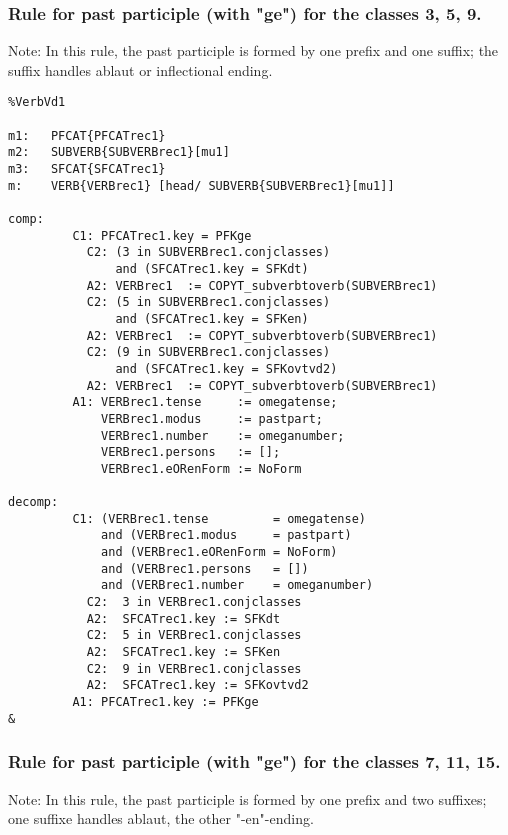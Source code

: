 \subsubsection{Rule for past participle (with "ge") for the classes  3, 5, 9.}

Note: In this rule, the past participle is formed by one prefix and one
suffix; the suffix handles ablaut or inflectional ending.

\begin{verbatim}
%VerbVd1 

m1:   PFCAT{PFCATrec1}
m2:   SUBVERB{SUBVERBrec1}[mu1]
m3:   SFCAT{SFCATrec1}
m:    VERB{VERBrec1} [head/ SUBVERB{SUBVERBrec1}[mu1]]

comp:
         C1: PFCATrec1.key = PFKge 
           C2: (3 in SUBVERBrec1.conjclasses) 
               and (SFCATrec1.key = SFKdt) 
           A2: VERBrec1  := COPYT_subverbtoverb(SUBVERBrec1)
           C2: (5 in SUBVERBrec1.conjclasses)
               and (SFCATrec1.key = SFKen) 
           A2: VERBrec1  := COPYT_subverbtoverb(SUBVERBrec1)
           C2: (9 in SUBVERBrec1.conjclasses)
               and (SFCATrec1.key = SFKovtvd2) 
           A2: VERBrec1  := COPYT_subverbtoverb(SUBVERBrec1)
         A1: VERBrec1.tense     := omegatense;
             VERBrec1.modus     := pastpart;
             VERBrec1.number    := omeganumber;
             VERBrec1.persons   := [];
             VERBrec1.eORenForm := NoForm

decomp:
         C1: (VERBrec1.tense         = omegatense) 
             and (VERBrec1.modus     = pastpart)
             and (VERBrec1.eORenForm = NoForm) 
             and (VERBrec1.persons   = [])
             and (VERBrec1.number    = omeganumber)
           C2:  3 in VERBrec1.conjclasses
           A2:  SFCATrec1.key := SFKdt
           C2:  5 in VERBrec1.conjclasses
           A2:  SFCATrec1.key := SFKen
           C2:  9 in VERBrec1.conjclasses 
           A2:  SFCATrec1.key := SFKovtvd2
         A1: PFCATrec1.key := PFKge
&
\end{verbatim}
\newpage
\subsubsection{Rule for past participle (with "ge") for the classes 7, 11, 15.}

Note: In this rule, the past participle is formed by one prefix and two
suffixes; one suffixe handles ablaut, the other "-en"-ending.

